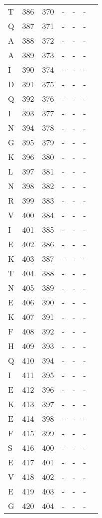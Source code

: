 \documentclass[10pt]{article}
\begin{document}
\begin{longtable}{lllllll}
  T & 386 & 370 & - & - & - &  \\ 
  Q & 387 & 371 & - & - & - &  \\ 
  A & 388 & 372 & - & - & - &  \\ 
  A & 389 & 373 & - & - & - &  \\ 
  I & 390 & 374 & - & - & - &  \\ 
  D & 391 & 375 & - & - & - &  \\ 
  Q & 392 & 376 & - & - & - &  \\ 
  I & 393 & 377 & - & - & - &  \\ 
  N & 394 & 378 & - & - & - &  \\ 
  G & 395 & 379 & - & - & - &  \\ 
  K & 396 & 380 & - & - & - &  \\ 
  L & 397 & 381 & - & - & - &  \\ 
  N & 398 & 382 & - & - & - &  \\ 
  R & 399 & 383 & - & - & - &  \\ 
  V & 400 & 384 & - & - & - &  \\ 
  I & 401 & 385 & - & - & - &  \\ 
  E & 402 & 386 & - & - & - &  \\ 
  K & 403 & 387 & - & - & - &  \\ 
  T & 404 & 388 & - & - & - &  \\ 
  N & 405 & 389 & - & - & - &  \\ 
  E & 406 & 390 & - & - & - &  \\ 
  K & 407 & 391 & - & - & - &  \\ 
  F & 408 & 392 & - & - & - &  \\ 
  H & 409 & 393 & - & - & - &  \\ 
  Q & 410 & 394 & - & - & - &  \\ 
  I & 411 & 395 & - & - & - &  \\ 
  E & 412 & 396 & - & - & - &  \\ 
  K & 413 & 397 & - & - & - &  \\ 
  E & 414 & 398 & - & - & - &  \\ 
  F & 415 & 399 & - & - & - &  \\ 
  S & 416 & 400 & - & - & - &  \\ 
  E & 417 & 401 & - & - & - &  \\ 
  V & 418 & 402 & - & - & - &  \\ 
  E & 419 & 403 & - & - & - &  \\ 
  G & 420 & 404 & - & - & - &  \\ 

\end{longtable}
\end{document}
